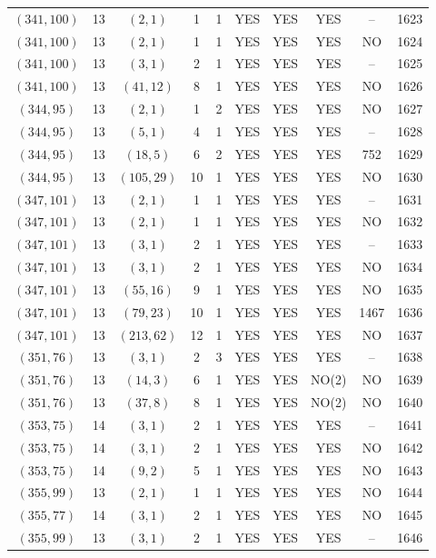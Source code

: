 \begin{longtable}{|c|c|c|c|c|c|c|c|c|c|}
$(341, 100)$ & 13 & $(2, 1)$ & 1 & 1 & YES & YES & YES & -- & 1623\\
$(341, 100)$ & 13 & $(2, 1)$ & 1 & 1 & YES & YES & YES & NO & 1624\\
$(341, 100)$ & 13 & $(3, 1)$ & 2 & 1 & YES & YES & YES & -- & 1625\\
$(341, 100)$ & 13 & $(41, 12)$ & 8 & 1 & YES & YES & YES & NO & 1626\\
$(344, 95)$ & 13 & $(2, 1)$ & 1 & 2 & YES & YES & YES & NO & 1627\\
$(344, 95)$ & 13 & $(5, 1)$ & 4 & 1 & YES & YES & YES & -- & 1628\\
$(344, 95)$ & 13 & $(18, 5)$ & 6 & 2 & YES & YES & YES & 752 & 1629\\
$(344, 95)$ & 13 & $(105, 29)$ & 10 & 1 & YES & YES & YES & NO & 1630\\
$(347, 101)$ & 13 & $(2, 1)$ & 1 & 1 & YES & YES & YES & -- & 1631\\
$(347, 101)$ & 13 & $(2, 1)$ & 1 & 1 & YES & YES & YES & NO & 1632\\
$(347, 101)$ & 13 & $(3, 1)$ & 2 & 1 & YES & YES & YES & -- & 1633\\
$(347, 101)$ & 13 & $(3, 1)$ & 2 & 1 & YES & YES & YES & NO & 1634\\
$(347, 101)$ & 13 & $(55, 16)$ & 9 & 1 & YES & YES & YES & NO & 1635\\
$(347, 101)$ & 13 & $(79, 23)$ & 10 & 1 & YES & YES & YES & 1467 & 1636\\
$(347, 101)$ & 13 & $(213, 62)$ & 12 & 1 & YES & YES & YES & NO & 1637\\
$(351, 76)$ & 13 & $(3, 1)$ & 2 & 3 & YES & YES & YES & -- & 1638\\
$(351, 76)$ & 13 & $(14, 3)$ & 6 & 1 & YES & YES & NO(2) & NO & 1639\\
$(351, 76)$ & 13 & $(37, 8)$ & 8 & 1 & YES & YES & NO(2) & NO & 1640\\
$(353, 75)$ & 14 & $(3, 1)$ & 2 & 1 & YES & YES & YES & -- & 1641\\
$(353, 75)$ & 14 & $(3, 1)$ & 2 & 1 & YES & YES & YES & NO & 1642\\
$(353, 75)$ & 14 & $(9, 2)$ & 5 & 1 & YES & YES & YES & NO & 1643\\
$(355, 99)$ & 13 & $(2, 1)$ & 1 & 1 & YES & YES & YES & NO & 1644\\
$(355, 77)$ & 14 & $(3, 1)$ & 2 & 1 & YES & YES & YES & NO & 1645\\
$(355, 99)$ & 13 & $(3, 1)$ & 2 & 1 & YES & YES & YES & -- & 1646\\

\end{longtable}

